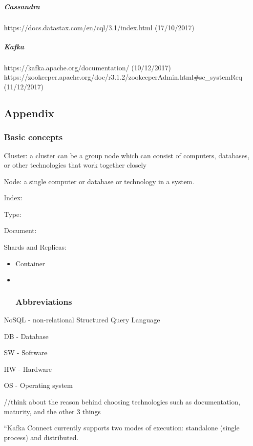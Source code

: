\documentclass[]{article}
\let\oldsubparagraph\subparagraph
\renewcommand{\subparagraph}[1]{\oldsubparagraph{#1}\mbox{}}
\begin{document}
\hypertarget{cassandra-1}{%
\subparagraph{Cassandra}\label{cassandra-1}}

https://docs.datastax.com/en/cql/3.1/index.html (17/10/2017)

\hypertarget{kafka-2}{%
\subparagraph{Kafka}\label{kafka-2}}

https://kafka.apache.org/documentation/ (10/12/2017)
https://zookeeper.apache.org/doc/r3.1.2/zookeeperAdmin.html\#sc\_systemReq
(11/12/2017)

\hypertarget{appendix}{%
\subsection{Appendix}\label{appendix}}

\hypertarget{basic-concepts}{%
\subsubsection{Basic concepts}\label{basic-concepts}}

Cluster: a cluster can be a group node which can consist of computers,
databases, or other technologies that work together closely

Node: a single computer or database or technology in a system.

Index:

Type:

Document:

Shards and Replicas:

\begin{itemize}
\item
  Container
\item ~
  \hypertarget{abbreviations}{%
  \subsubsection{Abbreviations}\label{abbreviations}}
\end{itemize}

NoSQL - non-relational Structured Query Language

DB - Database

SW - Software

HW - Hardware

OS - Operating system

//think about the reason behind choosing technologies such as
documentation, maturity, and the other 3 things

``Kafka Connect currently supports two modes of execution: standalone
(single process) and distributed.
\end{document}
